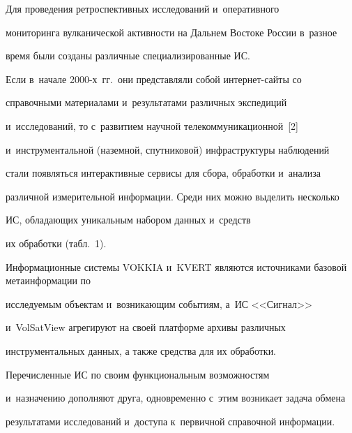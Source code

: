      Для проведения ретроспективных исследований и~оперативного 


мониторинга вулканической активности на Дальнем Востоке России в~разное 


время были созданы различные специализированные ИС. 


Если в~начале 2000-х~гг.\ они представляли собой ин\-тер\-нет-сай\-ты со 


справочными материалами и~результатами различных экспедиций 


и~исследований, то с~развитием научной телекоммуникационной~[2] 


и~инструментальной (наземной, спутниковой) инфраструктуры наблюдений 


стали появляться интерактивные сервисы для сбора, обработки и~анализа 


различной измерительной информации. Среди них можно выделить несколько 


ИС, обладающих уникальным набором данных и~средств 


их обработки (табл.~1). 


     











Информационные системы VOKKIA и~KVERT являются источниками базовой метаинформации по 


исследуемым объектам и~возникающим событиям, а~ИС <<Сигнал>> 


и~VolSatView агрегируют на своей платформе архивы различных 


инструментальных данных, а также средства для их обработки. 











     Перечисленные ИС по своим функциональным возможностям 


и~назначению дополняют друга, одновременно с~этим возникает задача обмена 


результатами исследований и~доступа к~первичной справочной информации.


